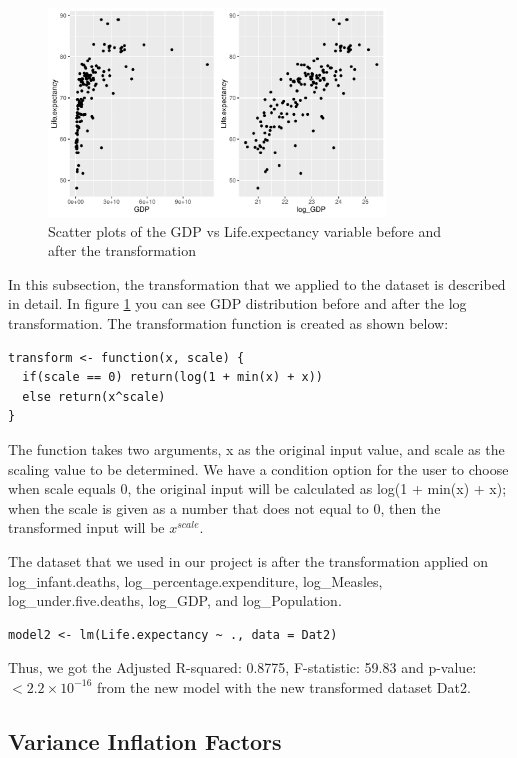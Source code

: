 \begin{figure}
  \centering
  \includegraphics[width = 0.8\textwidth]{figures/transforms}
  \caption{Scatter plots of the GDP vs Life.expectancy variable before and after the transformation}
  \label{fig:transforms}
\end{figure}

In this subsection, the transformation that we applied to the dataset is described in detail. In figure \ref{fig:transforms} you can see GDP distribution before and after the log transformation. The transformation function is created as shown below:
\begin{verbatim}
transform <- function(x, scale) {
  if(scale == 0) return(log(1 + min(x) + x))
  else return(x^scale)
}
\end{verbatim}
The function takes two arguments, x as the original input value, and scale as the scaling value to be determined. We have a condition option for the user to choose when scale equals 0, the original input will be calculated as log(1 + min(x) + x); when the scale is given as a number that does not equal to 0, then the transformed input will be $x^{scale}$.



The dataset that we used in our project is after the transformation applied on log\_infant.deaths, log\_percentage.expenditure, log\_Measles, log\_under.five.deaths, log\_GDP, and log\_Population.

\begin{verbatim}
model2 <- lm(Life.expectancy ~ ., data = Dat2)
\end{verbatim}

Thus, we got the Adjusted R-squared: 0.8775, F-statistic: 59.83 and p-value: $< 2.2\times 10^{-16}$ from the new model with the new transformed dataset Dat2.

\subsection{Variance Inflation Factors}

